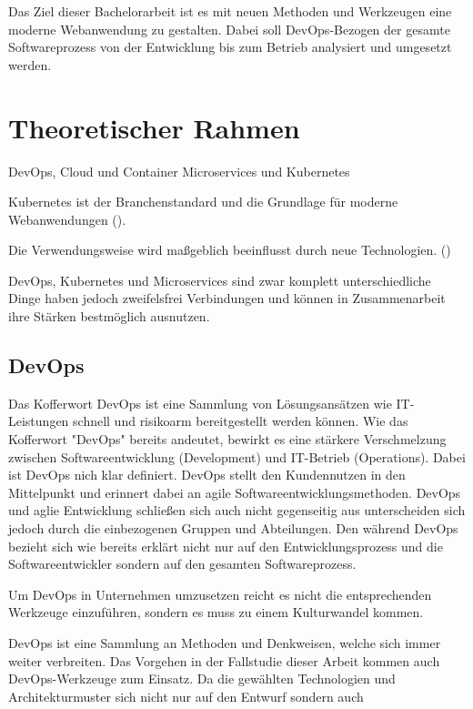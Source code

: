 
Das Ziel dieser Bachelorarbeit ist es mit neuen Methoden und Werkzeugen eine moderne Webanwendung zu gestalten. Dabei soll DevOps-Bezogen der gesamte Softwareprozess von der Entwicklung bis zum Betrieb analysiert und umgesetzt werden.

\section{Theoretischer Rahmen}

DevOps, Cloud und Container Microservices und Kubernetes

Kubernetes ist der Branchenstandard und die Grundlage für moderne Webanwendungen (\cite[Vorwort]{arundelCloud2019}).

Die Verwendungsweise wird maßgeblich beeinflusst durch neue Technologien. (\cite[S. 16]{newmanMicroservices2015})

DevOps, Kubernetes und Microservices sind zwar komplett unterschiedliche Dinge haben jedoch zweifelsfrei Verbindungen und können in Zusammenarbeit ihre Stärken bestmöglich ausnutzen.

\subsection{DevOps}

Das Kofferwort DevOps ist eine Sammlung von Lösungsansätzen wie IT-Leistungen schnell und risikoarm bereitgestellt werden können. Wie das Kofferwort "DevOps" bereits andeutet, bewirkt es eine stärkere Verschmelzung zwischen Softwareentwicklung (Development) und IT-Betrieb (Operations). Dabei ist DevOps nich klar definiert. DevOps stellt den Kundennutzen in den Mittelpunkt und erinnert dabei an agile Softwareentwicklungsmethoden. DevOps und aglie Entwicklung schließen sich auch nicht gegenseitig aus unterscheiden sich jedoch durch die einbezogenen Gruppen und Abteilungen. Den während DevOps bezieht sich wie bereits erklärt nicht nur auf den Entwicklungsprozess und die Softwareentwickler sondern auf den gesamten Softwareprozess.

Um DevOps in Unternehmen umzusetzen reicht es nicht die entsprechenden Werkzeuge einzuführen, sondern es muss zu einem Kulturwandel kommen.

DevOps ist eine Sammlung an Methoden und Denkweisen, welche sich immer weiter verbreiten. Das Vorgehen in der Fallstudie dieser Arbeit kommen auch DevOps-Werkzeuge zum Einsatz. Da die gewählten Technologien und Architekturmuster sich nicht nur auf den Entwurf sondern auch


